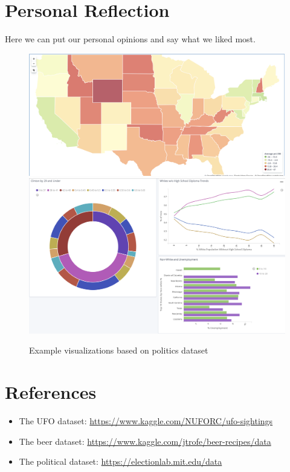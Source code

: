 \documentclass[bibliography=totoc]{article}
\begin{document}
\section{Personal Reflection}
Here we can put our personal opinions and say what we liked most.

\begin{figure}
   \includegraphics[width=\linewidth]{partisan_lean.png} 
   \includegraphics[width=\linewidth]{politics_misc.png} 
   \caption{\label{politics_examples}Example visualizations based on politics dataset}
\end{figure}

\section{References}
\begin{itemize}
  \item The UFO dataset: \href{}{https://www.kaggle.com/NUFORC/ufo-sightings}
  \item The beer dataset: \href{}{https://www.kaggle.com/jtrofe/beer-recipes/data}
  \item The political dataset: \href{}{https://electionlab.mit.edu/data}
  
\end{itemize}
\end{document}
